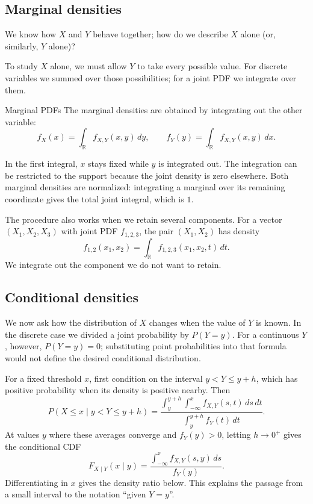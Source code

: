 \documentclass[a4paper,12pt,oneside]{report}
\begin{document}
\subsection{Marginal densities}
\label{sec:marginal-pdf-continuous}

We know how $X$ and $Y$ behave together; how do we describe $X$ alone
(or, similarly, $Y$ alone)?

To study $X$ alone, we must allow $Y$ to take every possible value.
For discrete variables we summed over those possibilities; for a
joint PDF we integrate over them.

\begin{framedprop}{Marginal PDFs}
\label{prop:marginal-pdfs}
The marginal densities are obtained by integrating out the
other variable:
\[
  f_X(x)=\int_{\mathbb R}f_{X,Y}(x,y)\,dy,
  \qquad
  f_Y(y)=\int_{\mathbb R}f_{X,Y}(x,y)\,dx.
\]
\end{framedprop}

In the first integral, $x$ stays fixed while $y$ is integrated out.
The integration can be restricted to the support because the joint
density is zero elsewhere. Both marginal densities are normalized:
integrating a marginal over its remaining coordinate gives the
total joint integral, which is $1$.

The procedure also works when we retain several components.
For a vector $(X_1,X_2,X_3)$ with joint PDF $f_{1,2,3}$, the pair
$(X_1,X_2)$ has density
\[
  f_{1,2}(x_1,x_2)
    =\int_{\mathbb R}f_{1,2,3}(x_1,x_2,t)\,dt.
\]
We integrate out the component we do not want to retain.

\subsection{Conditional densities}
\label{sec:conditional-pdf-continuous}

We now ask how the distribution of $X$ changes when the value of
$Y$ is known. In the discrete case we divided a joint probability
by $P(Y=y)$. For a continuous $Y$, however, $P(Y=y)=0$; substituting
point probabilities into that formula would not define the desired
conditional distribution.

For a fixed threshold $x$, first condition on the interval
$y<Y\leq y+h$, which has positive probability when its density
is positive nearby. Then
\[
  P(X\leq x\mid y<Y\leq y+h)
  =\frac{\displaystyle\int_y^{y+h}\int_{-\infty}^x
                f_{X,Y}(s,t)\,ds\,dt}
         {\displaystyle\int_y^{y+h}f_Y(t)\,dt}.
\]
At values $y$ where these averages converge and $f_Y(y)>0$,
letting $h\to0^+$ gives the conditional CDF
\[
  F_{X\mid Y}(x\mid y)
    =\frac{\displaystyle\int_{-\infty}^x f_{X,Y}(s,y)\,ds}
           {f_Y(y)}.
\]
Differentiating in $x$ gives the density ratio below. This explains
the passage from a small interval to the notation ``given $Y=y$''.
\end{document}
